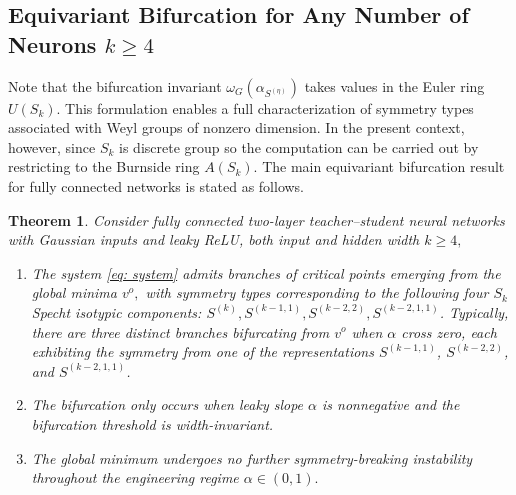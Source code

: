 \documentclass{amsart}%
\newtheorem{theorem}{Theorem}
\begin{document}
\subsection{Equivariant Bifurcation for Any Number of Neurons \texorpdfstring{$k\ge 4$}{k≥4}} Note that the bifurcation invariant $\omega_G(\alpha_{S^{(\eta)}})$ takes values in the Euler ring $U(S_k).$ This formulation enables a full characterization of symmetry types associated with Weyl groups of nonzero dimension. In the present context, however, since $S_k$ is discrete group so the computation can be carried out by restricting to the Burnside ring $A(S_k)$. The main equivariant bifurcation result for fully connected networks is stated as follows. 
\begin{theorem}\label{thm:main}
Consider fully connected two-layer teacher–student neural networks with Gaussian inputs and leaky ReLU, both input and hidden width $k\ge 4,$ 
\begin{enumerate}
\item[i)] The system \eqref{eq: system}
admits branches of critical points emerging from the global minima $v^o,$ with symmetry types corresponding to the following four $S_k$ Specht isotypic components: $S^{(k)},S^{(k-1,1)},S^{(k-2,2)},S^{(k-2,1,1)}$. Typically, there are three distinct branches bifurcating from $v^o$ when $\alpha$ cross zero, each exhibiting the symmetry from one of the representations $S^{(k-1,1)}$, $S^{(k-2,2)}$, and $S^{(k-2,1,1)}$.
\item[ii)] The bifurcation only occurs when leaky slope $\alpha$ is nonnegative and the bifurcation threshold is width-invariant.
\item[iii)]  The global minimum undergoes no further symmetry-breaking instability
throughout the engineering regime $\alpha \in (0, 1).$
\end{enumerate}
\end{theorem}
\end{document}
